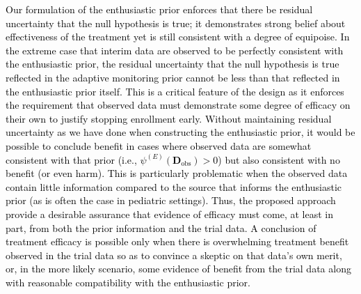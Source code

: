\documentclass[12pt]{article}
\begin{document}
\textcolor{black}{Our formulation of the enthusiastic prior enforces that there be residual uncertainty that the null hypothesis is true; it demonstrates strong belief about effectiveness of the treatment yet is still consistent with a degree of equipoise. In the extreme case that interim data are observed to be perfectly consistent with the enthusiastic prior, the residual uncertainty that the null hypothesis is true reflected in the adaptive monitoring prior cannot be less than that reflected in the enthusiastic prior itself. This is a critical feature of the design as it enforces the requirement that observed data must demonstrate some degree of efficacy on their own to justify stopping enrollment early. Without maintaining residual uncertainty as we have done when constructing the enthusiastic prior, it would be possible to conclude benefit in cases where observed data are somewhat consistent with that prior (i.e., $\psi^{(E)}(\mathbf{D}_{\text{obs}}) > 0$) but also consistent with no benefit (or even harm). This is particularly problematic when the observed data contain little information compared to the source that informs the enthusiastic prior (as is often the case in pediatric settings). Thus, the proposed approach provide a desirable assurance that evidence of efficacy must come, at least in part, from both the prior information and the trial data. A conclusion of treatment efficacy is possible only when there is overwhelming treatment benefit observed in the trial data so as to convince a skeptic on that data's own merit, or, in the more likely scenario, some evidence of benefit from the trial data along with reasonable compatibility with the enthusiastic prior.}
\end{document}
